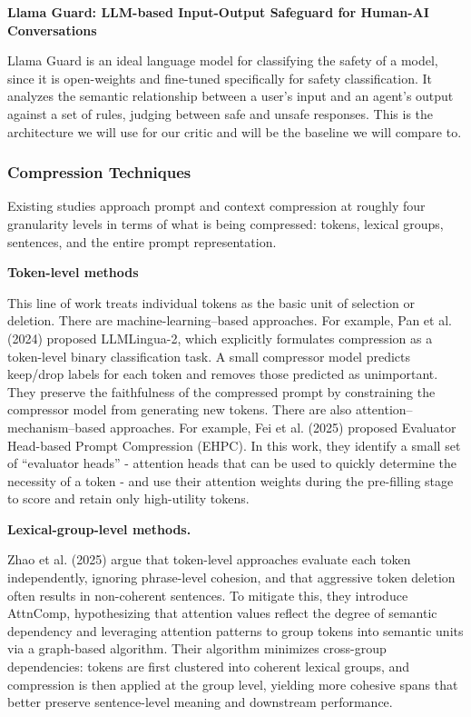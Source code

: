 \documentclass[11pt]{article}
\begin{document}
\noindent \textbf{Llama Guard: LLM-based Input-Output Safeguard for Human-AI Conversations}

Llama Guard is an ideal language model for classifying the safety of a model, since it is open-weights and fine-tuned specifically for safety classification. It analyzes the semantic relationship between a user's input and an agent's output against a set of rules, judging between safe and unsafe responses. This is the architecture we will use for our critic and will be the baseline we will compare to.



\subsubsection{Compression Techniques}

Existing studies approach prompt and context compression at roughly four granularity levels in terms of what is being compressed: tokens, lexical groups, sentences, and the entire prompt representation. \newline

\noindent\textbf{Token-level methods} 

This line of work treats individual tokens as the basic unit of selection or deletion. There are machine-learning–based approaches. For example, Pan et al. (2024) proposed LLMLingua-2, which explicitly formulates compression as a token-level binary classification task. A small compressor model predicts keep/drop labels for each token and removes those predicted as unimportant. They preserve the faithfulness of the compressed prompt by constraining the compressor model from generating new tokens. There are also attention–mechanism–based approaches. For example, Fei et al. (2025) proposed Evaluator Head-based Prompt Compression (EHPC). In this work, they identify a small set of “evaluator heads” - attention heads that can be used to quickly determine the necessity of a token - and use their attention weights during the pre-filling stage to score and retain only high-utility tokens. 


\noindent\textbf{Lexical-group-level methods.} 

Zhao et al. (2025) argue that token-level approaches evaluate each token independently, ignoring phrase-level cohesion, and that aggressive token deletion often results in non-coherent sentences. To mitigate this, they introduce AttnComp, hypothesizing that attention values reflect the degree of semantic dependency and leveraging attention patterns to group tokens into semantic units via a graph-based algorithm. Their algorithm minimizes cross-group dependencies: tokens are first clustered into coherent lexical groups, and compression is then applied at the group level, yielding more cohesive spans that better preserve sentence-level meaning and downstream performance. \newline
\end{document}
